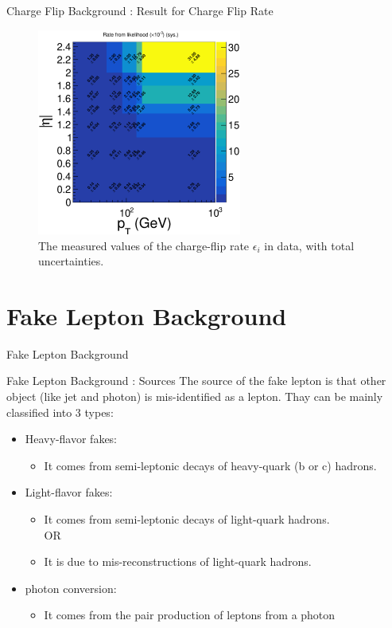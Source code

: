 \documentclass[mathserif,serif]{beamer}
\begin{document}
\begin{frame}{Charge Flip Background : Result for Charge Flip Rate}
\begin{figure}
\centering
\includegraphics[width=0.6\textwidth]{data/plot/charge_flip/FitPlots/data_cf_rate_tot.eps}
\caption{The measured values of the charge-flip rate $\epsilon_i$ in data, with total uncertainties.}
\label{fig:charge_flip_data_tot}
\end{figure}
\end{frame}

\section{Fake Lepton Background}
\begin{frame}
\begin{center}
\huge
Fake Lepton Background
\end{center}
\end{frame}

\begin{frame}{Fake Lepton Background : Sources}
The source of the fake lepton is that other object (like jet and photon) is mis-identified as a lepton. Thay can be mainly classified into 3 types:
\begin{itemize}
\item Heavy-flavor fakes:
\begin{itemize}
\item It comes from semi-leptonic decays of heavy-quark (b or c) hadrons.
\end{itemize}
\item Light-flavor fakes:
\begin{itemize}
\item It comes from semi-leptonic decays of light-quark hadrons. \\ OR
\item It is due to mis-reconstructions of light-quark hadrons.
\end{itemize}
\item photon conversion:
\begin{itemize}
\item It comes from the pair production of leptons from a photon
\end{itemize}
\end{itemize}
\end{frame}
\end{document}
